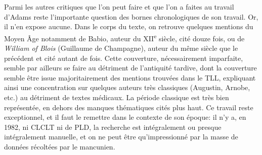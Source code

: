 Parmi les autres critiques que l'on peut faire et que l'on a faites au travail d'Adams reste l'importante question des bornes chronologiques de son travail. Or, il n'en expose aucune. Dans le corps du texte, on retrouve quelques mentions du Moyen Âge notamment de Babio, auteur du XII\textsuperscript{e} siècle, cité douze fois, ou de \textit{William of Blois} (Guillaume de Champagne), auteur du même siècle que le précédent et cité autant de fois. Cette couverture, nécessairement imparfaite, semble par ailleurs se faire au détriment de l'antiquité tardive, dont la couverture semble être issue majoritairement des mentions trouvées dans le TLL, expliquant ainsi une concentration sur quelques auteurs très classiques (Augustin, Arnobe, etc.) au détriment de textes médicaux. La période classique est très bien représentée, en dehors des manques thématiques cités plus haut. Ce travail reste exceptionnel, et il faut le remettre dans le contexte de son époque: il n'y a, en 1982, ni CLCLT ni de PLD, la recherche est intégralement ou presque intégralement manuelle, et on ne peut être qu'impressionné par la masse de données récoltées par le mancunien.



